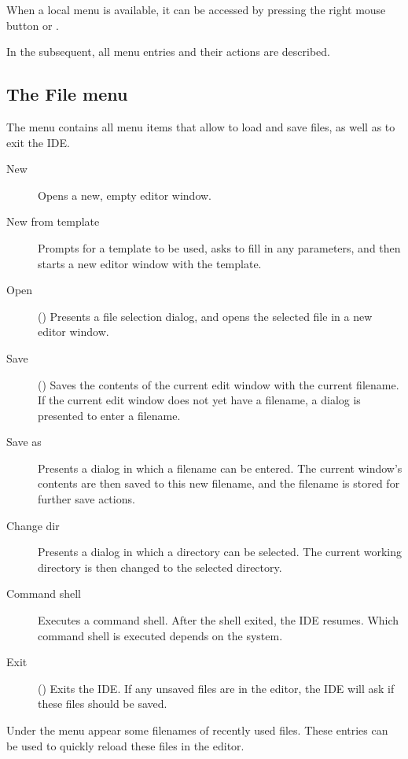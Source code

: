 When a local menu is available, it can be accessed by pressing
the right mouse button or . 

In the subsequent, all menu entries and their actions are described.
%
%
\subsection{The File menu}
\label{se:menufile}
The  menu contains all menu items that allow to load and save
files, as well as to exit the IDE.
\begin{description}
\item[New] Opens a new, empty editor window. 
\item[New from template] Prompts for a template to be used, asks to fill in
any parameters, and then starts a new editor window with the template.
\item[Open] () Presents a file selection dialog, and opens 
the selected file in a new editor window. 
\item[Save] () Saves the contents of the current edit window 
with the current filename. If the current edit window does not yet have
a filename, a dialog is presented to enter a filename.
\item[Save as] Presents a dialog in which a filename can be entered. The
current window's contents are then saved to this new filename, and the
filename is stored for further save actions.
\item[Change dir] Presents a dialog in which a directory can be selected.
The current working directory is then changed to the selected directory.
\item[Command shell] Executes a command shell. After the shell exited, the
IDE resumes. Which command shell is executed depends on the system. 
\item[Exit] () Exits the IDE. If any unsaved files are 
in the editor, the IDE will ask if these files should be saved.
\end{description}
Under the  menu appear some filenames of recently used files.
These entries can be used to quickly reload these files in the editor.

%
%
